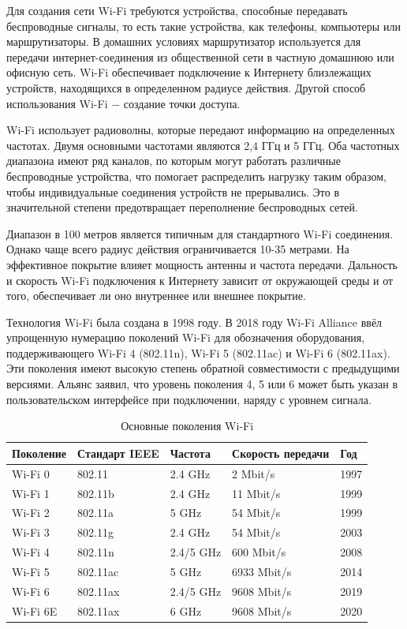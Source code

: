 	Для создания сети Wi-Fi требуются устройства, способные передавать беспроводные сигналы, то есть 
	такие устройства, как телефоны, компьютеры или маршрутизаторы. В домашних условиях маршрутизатор 
	используется для передачи интернет-соединения из общественной сети в частную домашнюю или офисную 
	сеть. Wi-Fi обеспечивает подключение к Интернету близлежащих устройств, находящихся в определенном 
	радиусе действия. Другой способ использования Wi-Fi $-$ создание точки доступа.
	
	Wi-Fi использует радиоволны, которые передают информацию на определенных частотах. Двумя основными
	частотами являются 2,4 ГГц и 5 ГГц. Оба частотных диапазона имеют ряд каналов, по которым могут 
	работать различные беспроводные устройства, что помогает распределить нагрузку таким образом, 
	чтобы индивидуальные соединения устройств не прерывались. Это в значительной степени предотвращает 
	переполнение беспроводных сетей.
	
	Диапазон в 100 метров является типичным для стандартного Wi-Fi соединения. Однако чаще всего радиус 
	действия ограничивается 10-35 метрами. На эффективное покрытие влияет мощность антенны 
	и частота передачи. Дальность и скорость Wi-Fi подключения к Интернету зависит от окружающей среды 
	и от того, обеспечивает ли оно внутреннее или внешнее покрытие.
	
	Технология Wi-Fi была создана в 1998 году. В 2018 году Wi-Fi Alliance \cite{wi-fi-alliance} ввёл упрощенную 
	нумерацию поколений Wi-Fi для обозначения оборудования, поддерживающего Wi-Fi 4 (802.11n), 
	Wi-Fi 5 (802.11ac) и Wi-Fi 6 (802.11ax). Эти поколения имеют высокую степень обратной совместимости 
	с предыдущими версиями. Альянс заявил, что уровень поколения 4, 5 или 6 может быть указан в 
	пользовательском интерфейсе при подключении, наряду с уровнем сигнала.
	
	\begin{table}[h]
		\centering
		\begin{tabular}{ | l | l | l | l | l | }
			\hline
			Поколение & Стандарт IEEE & Частота & Скорость передачи & Год \\ \hline
			Wi-Fi 0 & 802.11 & 2.4 GHz & 2 Mbit/s & 1997 \\ \hline
			Wi-Fi 1 & 802.11b & 2.4 GHz & 11 Mbit/s & 1999 \\ \hline
			Wi-Fi 2 & 802.11a & 5 GHz & 54 Mbit/s & 1999 \\ \hline
			Wi-Fi 3 & 802.11g & 2.4 GHz & 54 Mbit/s & 2003 \\ \hline
			Wi-Fi 4 & 802.11n & 2.4/5 GHz & 600 Mbit/s & 2008 \\ \hline
			Wi-Fi 5 & 802.11ac & 5 GHz & 6933 Mbit/s & 2014 \\ \hline
			Wi-Fi 6 & 802.11ax & 2.4/5 GHz & 9608 Mbit/s & 2019 \\ \hline
			Wi-Fi 6E & 802.11ax & 6 GHz & 9608 Mbit/s & 2020 \\
			\hline
		\end{tabular}
		\caption{Основные поколения Wi-Fi}
		\label{table-wi-fi-generations}
	\end{table}
	
